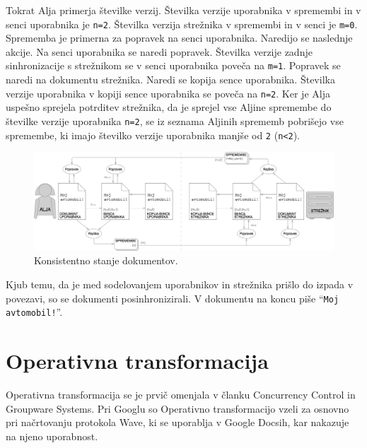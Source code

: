 \documentclass[a4paper, 12pt, twoside]{book}
\begin{document}
Tokrat Alja primerja številke verzij. Številka verzije uporabnika v spremembi in v senci uporabnika je {\tt n=2}. Številka verzija strežnika v spremembi in v senci je {\tt m=0}. Sprememba je primerna za popravek na senci uporabnika. Naredijo se naslednje akcije. Na senci uporabnika se naredi popravek. Številka verzije zadnje sinhronizacije s strežnikom se v senci uporabnika poveča na {\tt m=1}. Popravek se naredi na dokumentu strežnika. Naredi se kopija sence uporabnika. Številka verzije uporabnika v kopiji sence uporabnika se poveča na {\tt n=2}. Ker je Alja uspešno sprejela potrditev strežnika, da je sprejel vse Aljine spremembe do številke verzije uporabnika {\tt n=2}, se iz seznama Aljinih sprememb pobrišejo vse spremembe, ki imajo številko verzije uporabnika manjše od {\tt 2} ({\tt n<2}).

\begin{figure}[placement h]
\begin{center}
\includegraphics[width=16cm]{ds10.png}
\end{center}
\caption{Konsistentno stanje dokumentov.}
\label{ds10}
\end{figure}

Kjub temu, da je med sodelovanjem uporabnikov in strežnika prišlo do izpada v povezavi, so se dokumenti posinhronizirali. V dokumentu na koncu piše “{\tt Moj avtomobil!}”.

\section{Operativna transformacija}
\label{sec:ot}

Operativna transformacija se je prvič omenjala v članku Concurrency Control in Groupware Systems. Pri Googlu so Operativno transformacijo vzeli za osnovno pri načrtovanju protokola Wave, ki se uporablja v Google Docsih, kar nakazuje na njeno uporabnost.
\end{document}
